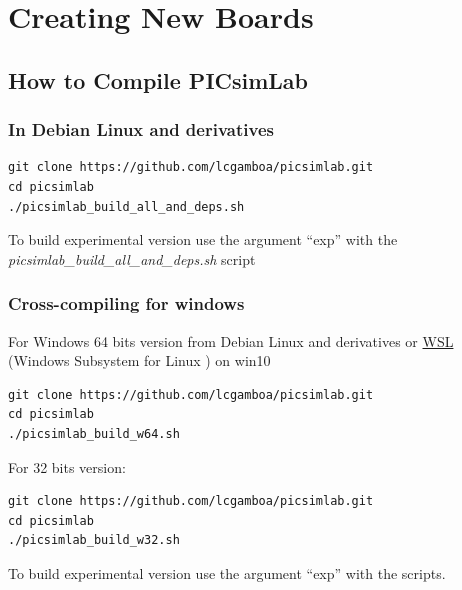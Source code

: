 \chapter{Creating New Boards}


\section{How to Compile PICsimLab}

\subsection{In Debian Linux and derivatives}

 \begin{verbatim}
git clone https://github.com/lcgamboa/picsimlab.git
cd picsimlab
./picsimlab_build_all_and_deps.sh
\end{verbatim}

To build experimental version use the argument ``exp'' with the \textit{picsimlab\_build\_all\_and\_deps.sh} script


\subsection{Cross-compiling for windows} 

For Windows 64 bits version from Debian Linux and derivatives or \href{https://docs.microsoft.com/windows/wsl/install-win10}{WSL} (Windows Subsystem for Linux ) on win10

\begin{verbatim}
git clone https://github.com/lcgamboa/picsimlab.git
cd picsimlab
./picsimlab_build_w64.sh
\end{verbatim}

For 32 bits version:

\begin{verbatim}
git clone https://github.com/lcgamboa/picsimlab.git
cd picsimlab
./picsimlab_build_w32.sh
\end{verbatim}

To build experimental version use the argument ``exp'' with the scripts.


